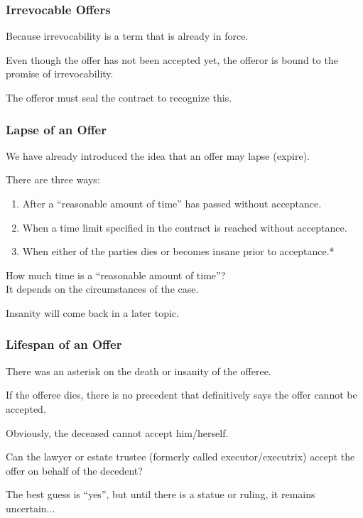 \begin{frame}
\frametitle{Irrevocable Offers}

Because irrevocability is a term that is already in force.

Even though the offer has not been accepted yet, the offeror is bound to the promise of irrevocability. 

The offeror must \alert{seal} the contract to recognize this.


\end{frame}

\begin{frame}
\frametitle{Lapse of an Offer}

We have already introduced the idea that an offer may lapse (expire).

There are three ways:

\begin{enumerate}
	\item After a ``reasonable amount of time'' has passed without acceptance.
	\item When a time limit specified in the contract is reached without acceptance.
	\item When either of the parties dies or becomes insane prior to acceptance.*
\end{enumerate}

How much time is a ``reasonable amount of time''?\\
\quad It depends on the circumstances of the case. 

Insanity will come back in a later topic.

\end{frame}



\begin{frame}
\frametitle{Lifespan of an Offer}

There was an asterisk on the death or insanity of the offeree.

If the offeree dies, there is no precedent that definitively says the offer cannot be accepted.

Obviously, the deceased cannot accept him/herself.

Can the lawyer or estate trustee (formerly called executor/executrix) accept the offer on behalf of the decedent?

The best guess is ``yes'', but until there is a statue or ruling, it remains uncertain...

\end{frame}







